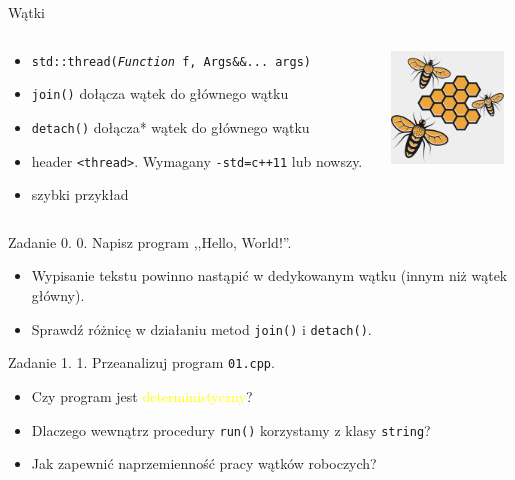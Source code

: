 \documentclass[aspectratio=169]{beamer}
\begin{document}
\begin{frame}[fragile]{Wątki}
\begin{columns}[T]
  \begin{column}{0.7\textwidth}
    \begin{itemize}
      \item{} \texttt{std::thread(\textit{Function} f, Args\&\&... args)}
      \item{} \texttt{join()} dołącza wątek do głównego wątku
      \item{} \texttt{detach()} dołącza* wątek do głównego wątku
      \item{} header \texttt{<thread>}. Wymagany \texttt{-std=c++11} lub nowszy.
      \item{} szybki przykład
    \end{itemize}
  \end{column}
  \begin{column}{0.25\textwidth}
    \includegraphics[height=3cm]{img/bees.png}
  \end{column}
\end{columns}
\end{frame}

\begin{frame}[fragile]{Zadanie 0.}
0. Napisz program ,,Hello, World!''.
  \begin{itemize}
    \item{} Wypisanie tekstu powinno nastąpić w dedykowanym wątku (innym niż wątek główny).
    \item{} Sprawdź różnicę w działaniu metod \texttt{join()} i \texttt{detach()}.
  \end{itemize}
\end{frame}

\begin{frame}[fragile]{Zadanie 1.}
1. Przeanalizuj program \texttt{01.cpp}.
  \begin{itemize}
    \item{} Czy program jest \textcolor{yellow}{deterministyczny}?
    \item{} Dlaczego wewnątrz procedury \texttt{run()} korzystamy z klasy \texttt{string}?
    \item{} Jak zapewnić naprzemienność pracy wątków roboczych?
  \end{itemize}
\end{frame}
\end{document}
